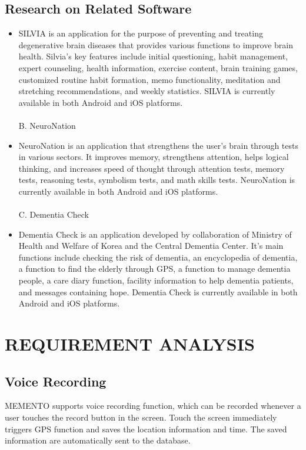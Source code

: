 \documentclass[conference]{IEEEtran}
\begin{document}
\subsection{Research on Related Software}\label{SCM}
\begin{itemize}
A. SILVIA\\
\item SILVIA is an application for the purpose of preventing and treating degenerative brain diseases that provides various functions to improve brain health. Silvia's key features include initial questioning, habit management, expert counseling, health information, exercise content, brain training games, customized routine habit formation, memo functionality, meditation and stretching recommendations, and weekly statistics. SILVIA is currently available in both Android and iOS platforms.\\
\\
B. NeuroNation\\
\item NeuroNation is an application that strengthens the user's brain through tests in various sectors. It improves memory, strengthens attention, helps logical thinking, and increases speed of thought through attention tests, memory tests, reasoning tests, symbolism tests, and math skills tests. NeuroNation is currently available in both Android and iOS platforms.\\
\\
C. Dementia Check\\
\item Dementia Check is an application developed by collaboration of Ministry of Health and Welfare of Korea and the Central Dementia Center. It’s main functions include checking the risk of dementia, an encyclopedia of dementia, a function to find the elderly through GPS, a function to manage dementia people, a care diary function, facility information to help dementia patients, and messages containing hope. Dementia Check is currently available in both Android and iOS platforms.\\
\end{itemize}

\section{REQUIREMENT ANALYSIS}
\subsection{Voice Recording}
MEMENTO supports voice recording function, which can be recorded whenever a user touches the record button in the screen. Touch the screen immediately triggers GPS function and saves the location information and time. The saved information are automatically sent to the database.\\
\end{document}
